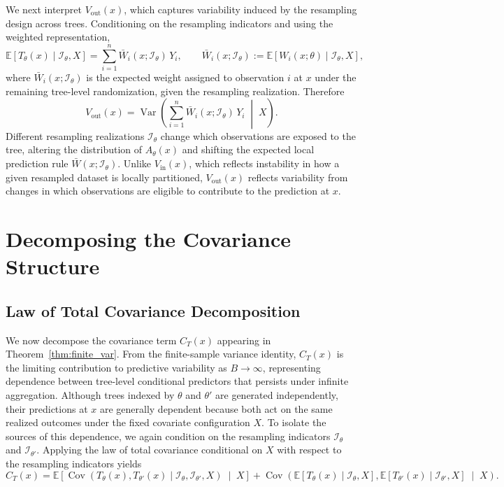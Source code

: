 \documentclass[11pt]{article}
\theoremstyle{plain}
\theoremstyle{definition}
\theoremstyle{remark}
\DeclareMathOperator{\Var}{Var}
\DeclareMathOperator{\Cov}{Cov}
\begin{document}
We next interpret $V_{\mathrm{out}}(x)$, which captures variability induced by the resampling design across trees. Conditioning on the resampling indicators and using the weighted representation,
\[
\mathbb E\!\left[T_\theta(x)\mid \mathcal I_\theta, X\right]
=
\sum_{i=1}^n \bar W_i(x;\mathcal I_\theta)\,Y_i,
\qquad
\bar W_i(x;\mathcal I_\theta)
:=
\mathbb E\!\left[W_i(x;\theta)\mid \mathcal I_\theta, X\right],
\]
where $\bar W_i(x;\mathcal I_\theta)$ is the expected weight assigned to observation $i$ at $x$ under the remaining tree-level randomization, given the resampling realization. Therefore
\[
V_{\mathrm{out}}(x)
=
\Var\!\left(
\sum_{i=1}^n \bar W_i(x;\mathcal I_\theta)\,Y_i
\;\middle|\;
X
\right).
\]
Different resampling realizations $\mathcal I_\theta$ change which observations are exposed to the tree, altering the distribution of $A_\theta(x)$ and shifting the expected local prediction rule $\bar W(x;\mathcal I_\theta)$. Unlike $V_{\mathrm{in}}(x)$, which reflects instability in how a given resampled dataset is locally partitioned, $V_{\mathrm{out}}(x)$ reflects variability from changes in which observations are eligible to contribute to the prediction at $x$.

\section{Decomposing the Covariance Structure}
\label{sec:covariance_decomposition}

\subsection{Law of Total Covariance Decomposition}
\label{subsec:lotc_decomposition}

We now decompose the covariance term $C_T(x)$ appearing in Theorem~\ref{thm:finite_var}. From the finite-sample variance identity, $C_T(x)$ is the limiting contribution to predictive variability as $B\to\infty$, representing dependence between tree-level conditional predictors that persists under infinite aggregation. Although trees indexed by $\theta$ and $\theta'$ are generated independently, their predictions at $x$ are generally dependent because both act on the same realized outcomes under the fixed covariate configuration $X$. To isolate the sources of this dependence, we again condition on the resampling indicators $\mathcal I_\theta$ and $\mathcal I_{\theta'}$. Applying the law of total covariance conditional on $X$ with respect to the resampling indicators yields
\begin{equation}
	\label{eq:lotc}
	C_T(x)
	=
	\mathbb E\!\left[
	\Cov\!\left(
	T_\theta(x), T_{\theta'}(x)
	\mid
	\mathcal I_\theta, \mathcal I_{\theta'}, X
	\right)
	\;\middle|\;
	X
	\right]
	+
	\Cov\!\left(
	\mathbb E\!\left[T_\theta(x)\mid \mathcal I_\theta, X\right],
	\mathbb E\!\left[T_{\theta'}(x)\mid \mathcal I_{\theta'}, X\right]
	\;\middle|\;
	X
	\right).
\end{equation}
\end{document}
